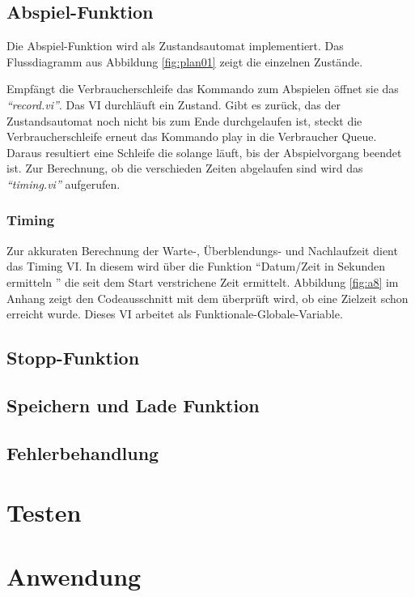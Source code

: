 \subsection{Abspiel-Funktion}
Die Abspiel-Funktion wird als Zustandsautomat implementiert. Das Flussdiagramm aus Abbildung \ref{fig:plan01} zeigt die einzelnen Zustände. 

Empfängt die Verbraucherschleife das Kommando zum Abspielen öffnet sie das \textit{"`record.vi"'}. Das VI durchläuft ein Zustand. Gibt es zurück, das der Zustandsautomat noch nicht bis zum Ende durchgelaufen ist, steckt die Verbraucherschleife erneut das Kommando play in die Verbraucher Queue. Daraus resultiert eine Schleife die solange läuft, bis der Abspielvorgang beendet ist.
Zur Berechnung, ob die verschieden Zeiten abgelaufen sind wird das  \textit{"`timing.vi"'} aufgerufen.

\subsubsection{Timing}
Zur akkuraten Berechnung der Warte-, Überblendungs- und Nachlaufzeit dient das Timing VI. In diesem wird über die Funktion "`Datum/Zeit in Sekunden ermitteln "' die seit dem Start verstrichene Zeit ermittelt. Abbildung \ref{fig:a8} im Anhang zeigt den Codeausschnitt mit dem überprüft wird, ob eine Zielzeit schon erreicht wurde. Dieses VI arbeitet als Funktionale-Globale-Variable.


		
		
		\subsection{Stopp-Funktion}
		
		
		\subsection{Speichern und Lade Funktion}
		
			
		\subsection{Fehlerbehandlung}

\section{Testen}		

\section{Anwendung}
